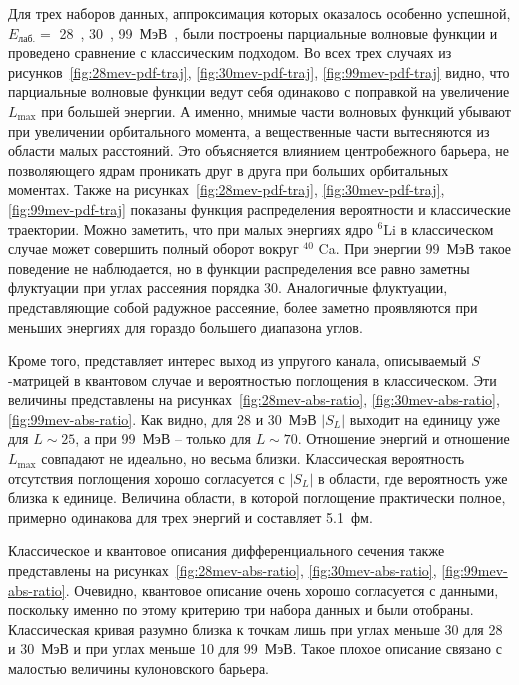 \documentclass[a4paper, 12pt]{article}
\def\Li{$^6$}
\def\Ca{$^{40}$}
\begin{document}
Для трех наборов данных, аппроксимация которых оказалось особенно 
успешной, $E_\text{лаб.}=$ 28~\cite{26-28-30-34mev}, 
30~\cite{26-28-30-34mev}, 99~МэВ~\cite{99mev}, были построены 
парциальные волновые функции и проведено сравнение с классическим 
подходом. Во всех трех случаях из рисунков~\ref{fig:28mev-pdf-traj}, 
\ref{fig:30mev-pdf-traj}, \ref{fig:99mev-pdf-traj} видно, что парциальные 
волновые функции ведут себя одинаково с поправкой на увеличение 
$L_\text{max}$ при большей энергии. А именно, мнимые части волновых 
функций убывают при увеличении орбитального момента, а вещественные 
части вытесняются из области малых расстояний. Это объясняется влиянием 
центробежного барьера, не позволяющего ядрам проникать друг в друга при 
больших орбитальных моментах. Также на 
рисунках~\ref{fig:28mev-pdf-traj}, \ref{fig:30mev-pdf-traj}, 
\ref{fig:99mev-pdf-traj} показаны функция распределения вероятности 
и классические траектории. Можно заметить, что при малых энергиях ядро 
\Li Li в классическом случае может совершить полный оборот вокруг \Ca 
Ca. При энергии 99~МэВ такое поведение не наблюдается, но в функции 
распределения все равно заметны флуктуации при углах рассеяния порядка 
30\textdegree. Аналогичные флуктуации, представляющие собой радужное 
рассеяние, более заметно проявляются при меньших энергиях для гораздо 
большего диапазона углов.

Кроме того, представляет интерес выход из упругого канала, описываемый 
\linebreak $S$\nobreakdash-матрицей в квантовом случае и вероятностью 
поглощения в классическом. Эти величины представлены на 
рисунках~\ref{fig:28mev-abs-ratio}, \ref{fig:30mev-abs-ratio}, 
\ref{fig:99mev-abs-ratio}. Как видно, для 28 и 30~МэВ $\left|S_L\right|$ 
выходит на единицу уже для $L\sim25$, а при 99~МэВ -- только для 
$L\sim70$. Отношение энергий и отношение $L_\text{max}$ совпадают не 
идеально, но весьма близки. Классическая вероятность отсутствия 
поглощения хорошо согласуется с $\left|S_L\right|$ в области, где 
вероятность уже близка к единице. Величина области, в которой поглощение 
практически полное, примерно одинакова для трех энергий и составляет 
5.1~фм.

Классическое и квантовое описания дифференциального сечения также 
представлены на рисунках~\ref{fig:28mev-abs-ratio}, 
\ref{fig:30mev-abs-ratio}, \ref{fig:99mev-abs-ratio}. Очевидно, 
квантовое описание очень хорошо согласуется с данными, поскольку именно 
по этому критерию три набора данных и были отобраны. Классическая кривая 
разумно близка к точкам лишь при углах меньше 30\textdegree{} для 28 
и 30~МэВ и при углах меньше 10{\textdegree} для 99~МэВ. Такое плохое 
описание связано с малостью величины кулоновского барьера.
\end{document}
